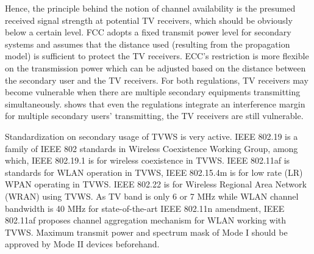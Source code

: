 Hence, the principle behind the notion of channel availability is the presumed received signal strength at potential TV receivers, which should be obviously below a certain level.
FCC adopts a fixed transmit power level for secondary systems and assumes that the distance used (resulting from the propagation model) is sufficient to protect the TV receivers.
ECC's restriction is more flexible on the transmission power which can be adjusted based on the distance between the secondary user and the TV receivers. 
For both regulations, TV receivers may become vulnerable when there are multiple secondary equipments transmitting simultaneously.
\cite{Jaentti11} shows that even the regulations integrate an interference margin for multiple secondary users' transmitting, the TV receivers are still vulnerable.

%
%
Standardization on secondary usage of TVWS is very active. IEEE 802.19 is a family of IEEE 802 standards in Wireless Coexistence Working Group, among which, IEEE 802.19.1 is for wireless coexistence in TVWS. IEEE 802.11af is standards for WLAN operation in TVWS, IEEE 802.15.4m is for low rate (LR) WPAN operating in TVWS. IEEE 802.22 is for Wireless Regional Area Network (WRAN) using TVWS. As TV band is only 6 or 7 MHz while WLAN channel bandwidth is 40 MHz for state-of-the-art IEEE 802.11n amendment, IEEE 802.11af proposes channel aggregation mechanism for WLAN working with TVWS. Maximum transmit power and spectrum mask of Mode I should be approved by Mode II devices beforehand.  


